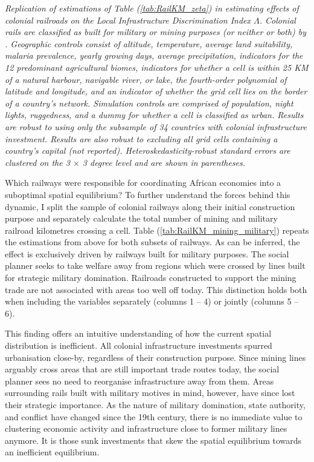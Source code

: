 \documentclass[11pt, oneside]{article}   	%
\let\oldref\ref
\renewcommand{\ref}[1]{(\oldref{#1})}
\newcommand{\mysubcaption}[1]{
\justify
\begin{spacing}{0.7}
\textit{\footnotesize #1}
\end{spacing}}
\begin{document}
\begin{table}[t]
\mysubcaption{Replication of estimations of Table \ref{tab:RailKM_zeta} in estimating effects of colonial railroads on the Local Infrastructure Discrimination Index $\Lambda$. Colonial rails are classified as built for military or mining purposes (or neither or both) by \cite{Jedwab_PermanentEffectsTransportation_2016a}. Geographic controls consist of altitude, temperature, average land suitability, malaria prevalence, yearly growing days, average precipitation, indicators for the 12 predominant agricultural biomes, indicators for whether a cell is within 25 KM of a natural harbour, navigable river, or lake, the fourth-order polynomial of latitude and longitude, and an indicator of whether the grid cell lies on the border of a country's network. Simulation controls are comprised of population, night lights, ruggedness, and a dummy for whether a cell is classified as urban. Results are robust to using only the subsample of 34 countries with colonial infrastructure investment. Results are also robust to excluding all grid cells containing a country's capital (not reported). Heteroskedasticity-robust standard errors are clustered on the 3 $\times$ 3 degree level and are shown in parentheses.}
\end{table}

Which railways were responsible for coordinating African economies into a suboptimal spatial equilibrium? To further understand the forces behind this dynamic, I split the sample of colonial railways along their initial construction purpose and separately calculate the total number of mining and military railroad kilometres crossing a cell. Table \ref{tab:RailKM_mining_military} repeats the estimations from above for both subsets of railways. As can be inferred, the effect is exclusively driven by railways built for military purposes. The social planner seeks to take welfare away from regions which were crossed by lines built for strategic military domination. Railroads constructed to support the mining trade are not associated with areas too well off today. This distinction holds both when including the variables separately (columns 1 -- 4) or jointly (columns 5 -- 6).

This finding offers an intuitive understanding of how the current spatial distribution is inefficient. All colonial infrastructure investments spurred urbanisation close-by, regardless of their construction purpose. Since mining lines arguably cross areas that are still important trade routes today, the social planner sees no need to reorganise infrastructure away from them. Areas surrounding rails built with military motives in mind, however, have since lost their strategic importance. As the nature of military domination, state authority, and conflict have changed since the 19th century, there is no immediate value to clustering economic activity and infrastructure close to former military lines anymore. It is those sunk investments that skew the spatial equilibrium towards an inefficient equilibrium.
\end{document}
